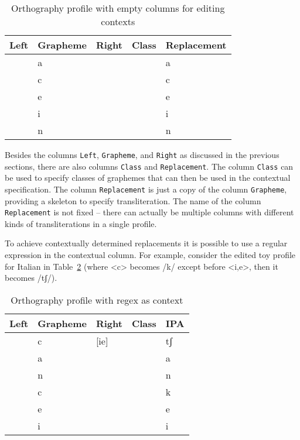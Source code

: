 \documentclass[output=book,nonflat,modfonts,
citecolor=brown,
		]{langsci/langscibook}\usepackage[]{graphicx}\usepackage[]{color}
\begin{document}
\begin{table}[htb]
\centering
\begingroup\scriptsize
\begin{tabular}{lllll}
  \toprule
Left & Grapheme & Right & Class & Replacement \\ 
  \midrule
 & a &  &  & a \\ 
   & c &  &  & c \\ 
   & e &  &  & e \\ 
   & i &  &  & i \\ 
   & n &  &  & n \\ 
   \bottomrule
\end{tabular}
\endgroup
\caption{Orthography profile with empty columns for editing contexts} 
\label{tab:profile_editing_1}
\end{table}


Besides the columns \texttt{Left}, \texttt{Grapheme}, and \texttt{Right} as
discussed in the previous sections, there are also columns \texttt{Class} and
\texttt{Replacement}. The column \texttt{Class} can be used to specify classes
of graphemes that can then be used in the contextual specification. The column
\texttt{Replacement} is just a copy of the column \texttt{Grapheme}, providing a
skeleton to specify transliteration. The name of the column
\texttt{Replacement} is not fixed -- there can actually be multiple columns with 
different kinds of transliterations in a single profile.

To achieve contextually determined replacements it is possible to use a regular
expression in the contextual column. For example, consider the edited toy
profile for Italian in Table~\ref{tab:profile_editing_2} (where <c> becomes /k/
except before <i,e>, then it becomes /tʃ/). 

\begin{table}[htb]
\centering
\begingroup\scriptsize
\begin{tabular}{lllll}
  \toprule
Left & Grapheme & Right & Class & IPA \\ 
  \midrule
 & c & [ie] &  & tʃ \\ 
   & a &  &  & a \\ 
   & n &  &  & n \\ 
   & c &  &  & k \\ 
   & e &  &  & e \\ 
   & i &  &  & i \\ 
   \bottomrule
\end{tabular}
\endgroup
\caption{Orthography profile with regex as context} 
\label{tab:profile_editing_2}
\end{table}
\end{document}

